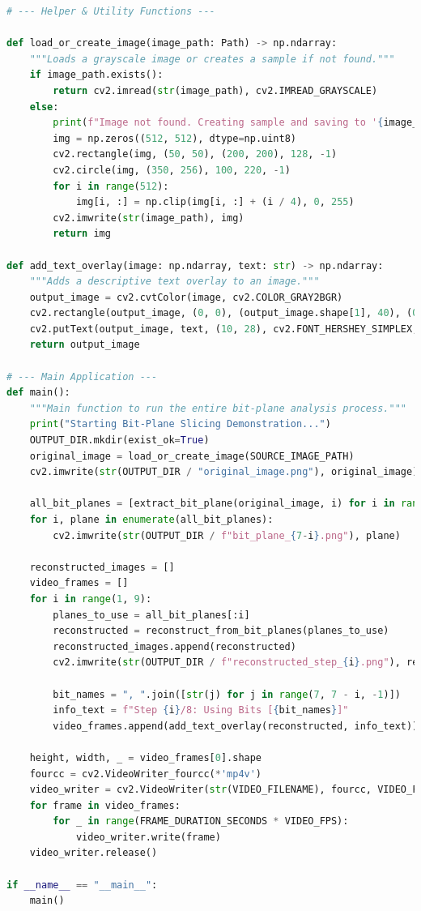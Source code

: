 \documentclass{article}
\begin{document}
\begin{lstlisting}[language=Python, caption={Rewritten Python script for bit-plane slicing and reconstruction.}, label={lst:code}]
# --- Helper & Utility Functions ---

def load_or_create_image(image_path: Path) -> np.ndarray:
    """Loads a grayscale image or creates a sample if not found."""
    if image_path.exists():
        return cv2.imread(str(image_path), cv2.IMREAD_GRAYSCALE)
    else:
        print(f"Image not found. Creating sample and saving to '{image_path}'")
        img = np.zeros((512, 512), dtype=np.uint8)
        cv2.rectangle(img, (50, 50), (200, 200), 128, -1)
        cv2.circle(img, (350, 256), 100, 220, -1)
        for i in range(512):
            img[i, :] = np.clip(img[i, :] + (i / 4), 0, 255)
        cv2.imwrite(str(image_path), img)
        return img

def add_text_overlay(image: np.ndarray, text: str) -> np.ndarray:
    """Adds a descriptive text overlay to an image."""
    output_image = cv2.cvtColor(image, cv2.COLOR_GRAY2BGR)
    cv2.rectangle(output_image, (0, 0), (output_image.shape[1], 40), (0, 0, 0), -1)
    cv2.putText(output_image, text, (10, 28), cv2.FONT_HERSHEY_SIMPLEX, 0.8, (0, 255, 0), 2)
    return output_image

# --- Main Application ---
def main():
    """Main function to run the entire bit-plane analysis process."""
    print("Starting Bit-Plane Slicing Demonstration...")
    OUTPUT_DIR.mkdir(exist_ok=True)
    original_image = load_or_create_image(SOURCE_IMAGE_PATH)
    cv2.imwrite(str(OUTPUT_DIR / "original_image.png"), original_image)

    all_bit_planes = [extract_bit_plane(original_image, i) for i in range(7, -1, -1)]
    for i, plane in enumerate(all_bit_planes):
        cv2.imwrite(str(OUTPUT_DIR / f"bit_plane_{7-i}.png"), plane)

    reconstructed_images = []
    video_frames = []
    for i in range(1, 9):
        planes_to_use = all_bit_planes[:i]
        reconstructed = reconstruct_from_bit_planes(planes_to_use)
        reconstructed_images.append(reconstructed)
        cv2.imwrite(str(OUTPUT_DIR / f"reconstructed_step_{i}.png"), reconstructed)
        
        bit_names = ", ".join([str(j) for j in range(7, 7 - i, -1)])
        info_text = f"Step {i}/8: Using Bits [{bit_names}]"
        video_frames.append(add_text_overlay(reconstructed, info_text))
        
    height, width, _ = video_frames[0].shape
    fourcc = cv2.VideoWriter_fourcc(*'mp4v')
    video_writer = cv2.VideoWriter(str(VIDEO_FILENAME), fourcc, VIDEO_FPS, (width, height))
    for frame in video_frames:
        for _ in range(FRAME_DURATION_SECONDS * VIDEO_FPS):
            video_writer.write(frame)
    video_writer.release()

if __name__ == "__main__":
    main()
\end{lstlisting}
\end{document}
